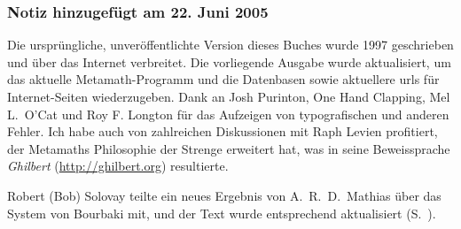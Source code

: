 \subsubsection{Notiz hinzugefügt am 22. Juni 2005}\label{note2002}

Die ursprüngliche, unveröffentlichte Version dieses Buches wurde 1997 geschrie\-ben und über das Internet verbreitet.  Die vorliegende Ausgabe wurde aktualisiert, um das aktuelle Metamath-Programm und die Datenbasen sowie aktuellere {\sc url}s für Internet-Seiten wiederzugeben.  Dank an Josh Purinton, One Hand Clapping, Mel L.\ O'Cat und Roy F. Longton für das Aufzeigen von typografischen und anderen Fehler.  Ich habe auch von zahlreichen Diskussionen mit Raph Levien profitiert, der Metamaths Philosophie der Strenge erweitert hat, was in seine Beweissprache {\em Ghilbert} (\url{http://ghilbert.org}) resultierte.

Robert (Bob) Solovay teilte ein neues Ergebnis von A.~R.~D.~Mathias über das System von Bourbaki mit, und der Text wurde entsprechend aktualisiert (S.~\pageref{bourbaki}).

